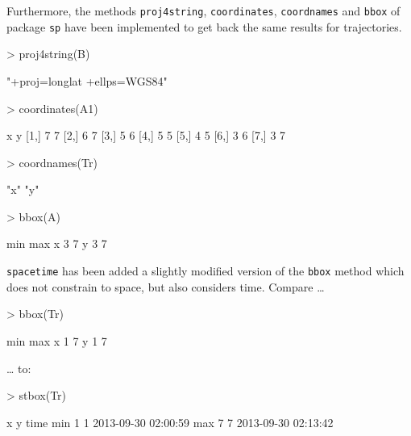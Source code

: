 \documentclass{article}
\newcommand{\code}[1]{{\tt #1}}
\begin{document}
Furthermore, the methods \code{proj4string}, \code{coordinates}, \code{coordnames} and \code{bbox} of package \code{sp} \cite{pebesma05, bivand13} have been implemented to get back the same results for trajectories.

\begin{Schunk}
\begin{Sinput}
> proj4string(B)
\end{Sinput}
\begin{Soutput}
[1] "+proj=longlat +ellps=WGS84"
\end{Soutput}
\begin{Sinput}
> coordinates(A1)
\end{Sinput}
\begin{Soutput}
     x y
[1,] 7 7
[2,] 6 7
[3,] 5 6
[4,] 5 5
[5,] 4 5
[6,] 3 6
[7,] 3 7
\end{Soutput}
\begin{Sinput}
> coordnames(Tr)
\end{Sinput}
\begin{Soutput}
[1] "x" "y"
\end{Soutput}
\begin{Sinput}
> bbox(A)
\end{Sinput}
\begin{Soutput}
  min max
x   3   7
y   3   7
\end{Soutput}
\end{Schunk}

\code{spacetime} has been added a slightly modified version of the \code{bbox} method which does not constrain to space, but also considers time. Compare \dots

\begin{Schunk}
\begin{Sinput}
> bbox(Tr)
\end{Sinput}
\begin{Soutput}
  min max
x   1   7
y   1   7
\end{Soutput}
\end{Schunk}

\dots{} to:

\begin{Schunk}
\begin{Sinput}
> stbox(Tr)
\end{Sinput}
\begin{Soutput}
    x y                time
min 1 1 2013-09-30 02:00:59
max 7 7 2013-09-30 02:13:42
\end{Soutput}
\end{Schunk}
\end{document}
